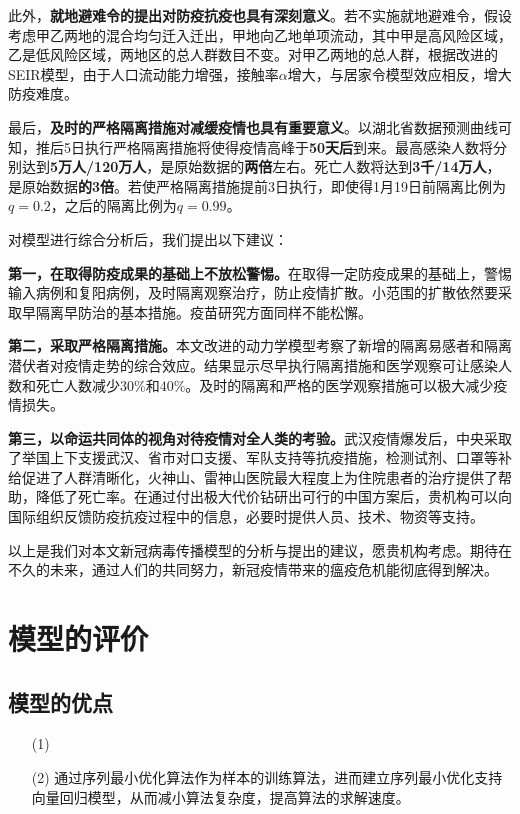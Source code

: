 \documentclass{whutmod}
\begin{document}
		此外，\textbf{就地避难令的提出对防疫抗疫也具有深刻意义}。若不实施就地避难令，假设考虑甲乙两地的混合均匀迁入迁出，甲地向乙地单项流动，其中甲是高风险区域，乙是低风险区域，两地区的总人群数目不变。对甲乙两地的总人群，根据改进的SEIR模型，由于人口流动能力增强，接触率$\alpha$增大，与居家令模型效应相反，增大防疫难度。
		
		最后，\textbf{及时的严格隔离措施对减缓疫情也具有重要意义}。以湖北省数据预测曲线可知，推后5日执行严格隔离措施将使得疫情高峰于\textbf{50天后}到来。最高感染人数将分别达到\textbf{5万人/120万人}，是原始数据的\textbf{两倍}左右。死亡人数将达到\textbf{3千/14万人}，是原始数据\textbf{的3倍}。若使严格隔离措施提前3日执行，即使得1月19日前隔离比例为$q=0.2$，之后的隔离比例为$q=0.99$。
	
		对模型进行综合分析后，我们提出以下建议：
		
		\textbf{第一，在取得防疫成果的基础上不放松警惕。}在取得一定防疫成果的基础上，警惕输入病例和复阳病例，及时隔离观察治疗，防止疫情扩散。小范围的扩散依然要采取早隔离早防治的基本措施。疫苗研究方面同样不能松懈。
		
		\textbf{第二，采取严格隔离措施。}本文改进的动力学模型考察了新增的隔离易感者和隔离潜伏者对疫情走势的综合效应。结果显示尽早执行隔离措施和医学观察可让感染人数和死亡人数减少$30\%$和$40\%$。及时的隔离和严格的医学观察措施可以极大减少疫情损失。
		
		\textbf{第三，以命运共同体的视角对待疫情对全人类的考验。}武汉疫情爆发后，中央采取了举国上下支援武汉、省市对口支援、军队支持等抗疫措施，检测试剂、口罩等补给促进了人群清晰化，火神山、雷神山医院最大程度上为住院患者的治疗提供了帮助，降低了死亡率。在通过付出极大代价钻研出可行的中国方案后，贵机构可以向国际组织反馈防疫抗疫过程中的信息，必要时提供人员、技术、物资等支持。
		
		以上是我们对本文新冠病毒传播模型的分析与提出的建议，愿贵机构考虑。期待在不久的未来，通过人们的共同努力，新冠疫情带来的瘟疫危机能彻底得到解决。
 
  	\section{模型的评价}
		\subsection{模型的优点}
			\begin{itemize}                                             
			\item [(1)]
			\item [(2)]通过序列最小优化算法作为样本的训练算法，进而建立序列最小优化支持向量回归模型，从而减小算法复杂度，提高算法的求解速度。
			
				
			\end{itemize}
\end{document}

